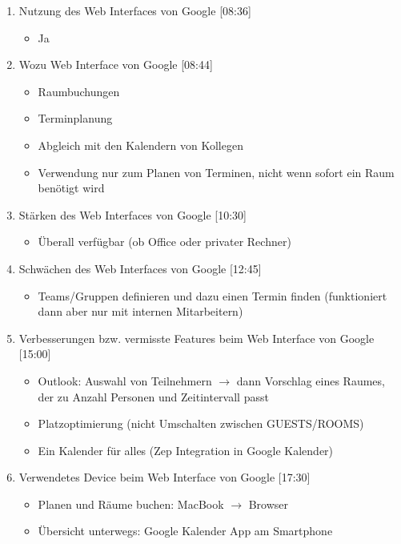 \begin{enumerate}

    \item Nutzung des Web Interfaces von Google [08:36]
     \begin{itemize}
        \item Ja
    \end{itemize}
    
    \item Wozu Web Interface von Google [08:44]
     \begin{itemize}
        \item Raumbuchungen
        \item Terminplanung
        \item Abgleich mit den Kalendern von Kollegen
        \item Verwendung nur zum Planen von Terminen, nicht wenn sofort ein Raum benötigt wird
    \end{itemize}
    
    \item Stärken des Web Interfaces von Google [10:30]
     \begin{itemize}
        \item Überall verfügbar (ob Office oder privater Rechner)
    \end{itemize}
    
    \item Schwächen des Web Interfaces von Google [12:45]
     \begin{itemize}
        \item Teams/Gruppen definieren und dazu einen Termin finden (funktioniert dann aber nur mit internen Mitarbeitern)
    \end{itemize}
    
    \item Verbesserungen bzw. vermisste Features beim Web Interface von Google [15:00]
    \begin{itemize}
        \item Outlook: Auswahl von Teilnehmern $\rightarrow$ dann Vorschlag eines Raumes, der zu Anzahl Personen und Zeitintervall passt
        \item Platzoptimierung (nicht Umschalten zwischen GUESTS/ROOMS)
        \item Ein Kalender für alles (Zep Integration in Google Kalender)
    \end{itemize}
    
    \item Verwendetes Device beim Web Interface von Google [17:30]
    \begin{itemize}
        \item Planen und Räume buchen: MacBook $\rightarrow$ Browser 
        \item Übersicht unterwegs: Google Kalender App am Smartphone
    \end{itemize}
    

\end{enumerate}
